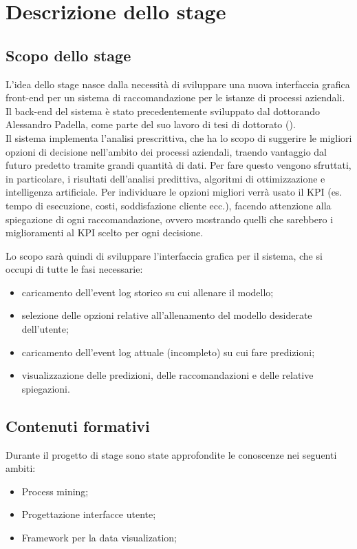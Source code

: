 
\chapter{Descrizione dello stage}
\section{Scopo dello stage}
L'idea dello stage nasce dalla necessità di sviluppare una nuova interfaccia grafica front-end per un sistema di raccomandazione per le istanze di processi aziendali.
\\
Il back-end del sistema è stato precedentemente sviluppato dal dottorando Alessandro Padella, come parte del suo lavoro di tesi di dottorato (\cite{paper-padella}). 
\\
Il sistema implementa l'analisi prescrittiva, che ha lo scopo di suggerire le migliori opzioni di decisione nell'ambito dei processi aziendali, traendo vantaggio dal futuro predetto tramite grandi quantità di dati. Per fare questo vengono sfruttati, in particolare, i risultati dell'analisi predittiva, algoritmi di ottimizzazione e intelligenza artificiale. Per individuare le opzioni migliori verrà usato il \gls{KPI} (es. tempo di esecuzione, costi, soddisfazione cliente ecc.), facendo attenzione alla spiegazione di ogni raccomandazione, ovvero mostrando quelli che sarebbero i miglioramenti al \gls{KPI} scelto per ogni decisione.

Lo scopo sarà quindi di sviluppare l'interfaccia grafica per il sistema, che si occupi di tutte le fasi necessarie: 
\begin{itemize}
\item caricamento dell'event log storico su cui allenare il modello;
\item selezione delle opzioni relative all'allenamento del modello desiderate dell'utente;
\item caricamento dell'event log attuale (incompleto) su cui fare predizioni;
\item visualizzazione delle predizioni, delle raccomandazioni e delle relative spiegazioni.
\end{itemize}

\section{Contenuti formativi}
Durante il progetto di stage sono state approfondite le conoscenze nei seguenti ambiti:
\begin{itemize}
\item Process mining; 
\item Progettazione interfacce utente;
\item Framework per la data visualization;
\end{itemize}

